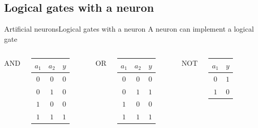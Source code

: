 \documentclass[10pt,compress]{beamer} %
\begin{document}
\subsection{Logical gates with a neuron}
\begin{frame}{Artificial neurons}{Logical gates with a neuron}
	A neuron can implement a logical gate

    \begin{columns}
	   		\centering AND\\
            

			 \begin{tabular}{ccc}\hline
			 $a_1$ & $a_2$ & $y$ \\\hline
			 $0$ & $0$ & $0$ \\
			 $0$ & $1$ & $0$ \\
			 $1$ & $0$ & $0$ \\
			 $1$ & $1$ & $1$ \\
			 \end{tabular}
	   		\centering OR\\
            

			 \begin{tabular}{ccc}\hline
			 $a_1$ & $a_2$ & $y$ \\\hline
			 $0$ & $0$ & $0$ \\
			 $0$ & $1$ & $1$ \\
			 $1$ & $0$ & $0$ \\
			 $1$ & $1$ & $1$ \\
			 \end{tabular}
	   		\centering NOT\\\bigskip
            
			\vspace{1cm}
			 \begin{tabular}{cc}\hline
			 $a_1$ & $y$ \\\hline
			 $0$ & $1$ \\
			 $1$ & $0$ \\
			 \end{tabular}

    \end{columns}
\end{frame}
\end{document}
